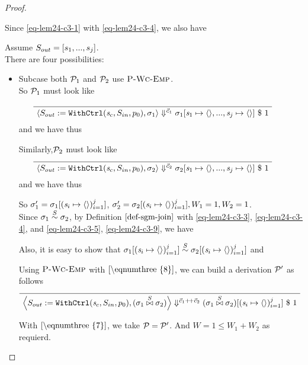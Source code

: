 \begin{proof}
\begin{itemize}
    Since \eqref{eq-lem24-c3-1} with \eqref{eq-lem24-c3-4}, we also have 
    
    Assume $S_{out} = [s_1,...,s_j]$. \\	
    There are four possibilities: 
   
    \begin{itemize}


    	\item Subcase both $\mathcal{P}_1$ and $\mathcal{P}_2$ use $\textsc{P-Wc-Emp}$. \\
    	
    	So $\mathcal{P}_1$ must look like 
    	
    	$$\PT{
    		\Axiom{\seval{\casethree}{\sgm_1}{\c_1}{\sgm_1[\s_1 \|-> \emptyv, ..., \s_j \|-> \emptyv]}{1}}
    	}$$
    	and we have   
        thus
    	
    	Similarly,$\mathcal{P}_2$ must look like  	
    	$$\PT{
    		\Axiom{\seval{\casethree}{\sgm_2}{\c_2}{\sgm_2[\s_1 \|-> \emptyv, ..., \s_j \|-> \emptyv]}{1}}
    	}$$
    	and we have   
    	thus

 \def\sgmbe#1{\sgm_#1[\j{\s_i \|-> \emptyv}]}
    	
    	So $\sgm_1' = \sgmbe{1}$, $\sgm_2' = \sgmbe{2}, W_1 = 1, W_2 =1 $. \\
    	
 	Since $\sigma_1 \stackrel{S}{\sim} \sigma_2$, by Definition $\ref{def-sgm-join}$ with \eqref{eq-lem24-c3-3}, \eqref{eq-lem24-c3-4}, and  \eqref{eq-lem24-c3-5}, \eqref{eq-lem24-c3-9}, we have    		
   		
   		Also, it is easy to show that $\sgmbe1 \~{\S} \sgmbe2$ and 
   		\eq{\eqnumthree{7}}{
   			\sgmbe1 \x{\S} \sgmbe2 = \sgmx[\j{\s_i \|-> \emptyv}]
   		}
   	
    Using $\textsc{P-Wc-Emp}$ with $\eqref{\eqnumthree{8}}$, we can build a derivation $\mathcal{P}'$ as follows
   		$$\PT{
   			\Axiom{\seval{\casethree}{\sgmx}{\cc}{\sgmx[\j{\s_i \|-> \emptyv}]}{1}}
   		}$$
   	
   	With $\eqref{\eqnumthree{7}}$, we take $\mathcal{P} = \mathcal{P}'$.
   	And $W = 1 \le W_1 + W_2$ as requierd.
   

\end{itemize}
\end{itemize}
\end{proof}
